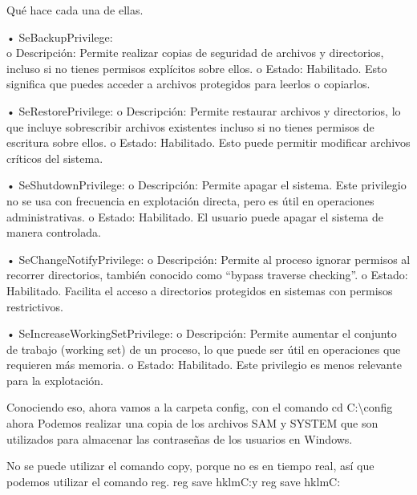 \documentclass[
  letterpaper,
  DIV=11,
  numbers=noendperiod]{scrreprt}
\begin{document}
Qué hace cada una de ellas.

• SeBackupPrivilege:\\
o Descripción: Permite realizar copias de seguridad de archivos y
directorios, incluso si no tienes permisos explícitos sobre ellos. o
Estado: Habilitado. Esto significa que puedes acceder a archivos
protegidos para leerlos o copiarlos.

• SeRestorePrivilege: o Descripción: Permite restaurar archivos y
directorios, lo que incluye sobrescribir archivos existentes incluso si
no tienes permisos de escritura sobre ellos. o Estado: Habilitado. Esto
puede permitir modificar archivos críticos del sistema.

• SeShutdownPrivilege: o Descripción: Permite apagar el sistema. Este
privilegio no se usa con frecuencia en explotación directa, pero es útil
en operaciones administrativas. o Estado: Habilitado. El usuario puede
apagar el sistema de manera controlada.

• SeChangeNotifyPrivilege: o Descripción: Permite al proceso ignorar
permisos al recorrer directorios, también conocido como ``bypass
traverse checking''. o Estado: Habilitado. Facilita el acceso a
directorios protegidos en sistemas con permisos restrictivos.

• SeIncreaseWorkingSetPrivilege: o Descripción: Permite aumentar el
conjunto de trabajo (working set) de un proceso, lo que puede ser útil
en operaciones que requieren más memoria. o Estado: Habilitado. Este
privilegio es menos relevante para la explotación.

Conociendo eso, ahora vamos a la carpeta config, con el comando cd
C:\Windows{}\textbackslash config ahora Podemos realizar una
copia de los archivos SAM y SYSTEM que son utilizados para almacenar las
contraseñas de los usuarios en Windows.

No se puede utilizar el comando copy, porque no es en tiempo real, así
que podemos utilizar el comando reg. reg save
hklm\sam C:\Windows\Temp\sam y reg save
hklm\system C:\Windows\Temp\system
\end{document}
